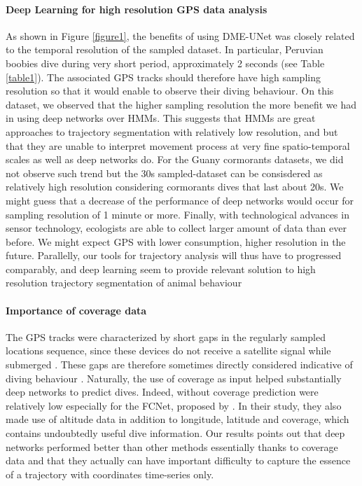 \documentclass{article}
\begin{document}
\paragraph{Deep Learning for high resolution GPS data analysis}
As shown in Figure \ref{figure1}, the benefits of using DME-UNet was closely related to the temporal resolution of the sampled dataset. In particular, Peruvian boobies dive during very short period, approximately 2 seconds (see Table \ref{table1}). The associated GPS tracks should therefore have high sampling resolution so that it would enable to observe their diving behaviour. On this dataset, we observed that the higher sampling resolution the more benefit we had in using deep networks over HMMs. This suggests that HMMs are great approaches to trajectory segmentation with relatively low resolution, and but that they are unable to interpret movement process at very fine spatio-temporal scales as well as deep networks do. For the Guany cormorants datasets, we did not observe such trend but the 30s sampled-dataset can be consisdered as relatively high resolution considering cormorants dives that last about 20s. We might guess that a decrease of the performance of deep networks would occur for sampling resolution of 1 minute or more.
Finally, with technological advances in sensor technology, ecologists are able to collect larger amount of data than ever before. We might expect GPS with lower consumption, higher resolution in the future. Parallelly, our tools for trajectory analysis will thus have to progressed comparably, and deep learning seem to provide relevant solution to high resolution trajectory segmentation of animal behaviour \cite{beyan_setting_2020,malde_machine_2020, yoda_advances_2019}

\paragraph{Importance of coverage data}
The GPS tracks were characterized by short gaps in the regularly sampled locations sequence, since these devices do not receive a satellite signal while submerged \cite{boyd_movement_2014,wilson_technological_2012}.
These gaps are therefore sometimes directly considered indicative of diving behaviour \cite{weimerskirch_foraging_2012}.
Naturally, the use of coverage as input helped substantially deep networks to predict dives.
Indeed, without coverage prediction were relatively low especially for the FCNet, proposed by \cite{browning_predicting_2018}.
In their study, they also made use of altitude data in addition to longitude, latitude and coverage, which contains undoubtedly useful dive information.
Our results points out that deep networks performed better than other methods essentially thanks to coverage data and that they actually can have important difficulty to capture the essence of a trajectory with coordinates time-series only.
\end{document}
